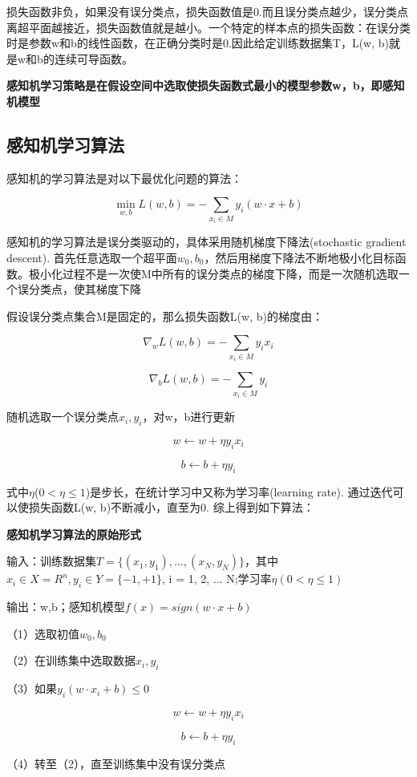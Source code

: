 \documentclass{ctexart}
\begin{document}
	损失函数非负，如果没有误分类点，损失函数值是0.而且误分类点越少，误分类点离超平面越接近，损失函数值就是越小。{\color{red}一个特定的样本点的损失函数：在误分类时是参数w和b的线性函数，在正确分类时是0.}因此给定训练数据集T，L(w, b)就是w和b的连续可导函数。
	
	\textbf{感知机学习策略是在假设空间中选取使损失函数式最小的模型参数w，b，即感知机模型}

	\subsection{感知机学习算法}
	
	感知机的学习算法是对以下最优化问题的算法：
	
	\[\min_{w, b}L(w, b) = -\sum_{x_i \in M}y_i(w·x + b)\]
	
	感知机的学习算法是误分类驱动的，具体采用{\color{red}随机}梯度下降法(stochastic gradient descent). 首先任意选取一个超平面\(w_0, b_0\)，然后用梯度下降法不断地极小化目标函数。极小化过程不是一次使M中所有的误分类点的梯度下降，而是一次随机选取一个误分类点，使其梯度下降
	
	假设误分类点集合M是固定的，那么损失函数L(w, b)的梯度由：
	
	\[\nabla_w L(w, b) = -\sum_{x_i \in M}y_ix_i\]
	
	\[\nabla_b L(w, b) = -\sum_{x_i \in M}y_i\]
	
	随机选取一个误分类点\(x_i, y_i\)，对w，b进行更新
	
	\[w \leftarrow w + \eta y_ix_i\]
	
	\[b \leftarrow b + \eta y_i\]
	
	式中\(\eta\)(\(0 < \eta \leq 1\))是步长，在统计学习中又称为学习率(learning rate). 通过迭代可以使损失函数L(w, b)不断减小，直至为0. 综上得到如下算法：
	
	\textbf{感知机学习算法的原始形式}
	
	输入：训练数据集\(T = \{(x_1, y_1),..., (x_N, y_N)\}\)，其中\(x_i \in X = R^n, y_i \in Y = \{-1, +1\}\), i = 1, 2, ... N;学习率\(\eta (0 < \eta \leq 1)\)
	
	输出：w,b；感知机模型\(f(x) = sign(w·x + b)\)
	
	（1）选取初值\(w_0, b_0\)
	
	（2）在训练集中选取数据\(x_i, y_i\)
	
	（3）如果\(y_i(w·x_i + b) \leq 0\)
	
		\[w \leftarrow w + \eta y_ix_i\]
	
		\[b \leftarrow b + \eta y_i\]
	  
	（4）转至（2），直至训练集中没有误分类点
	
\end{document}
